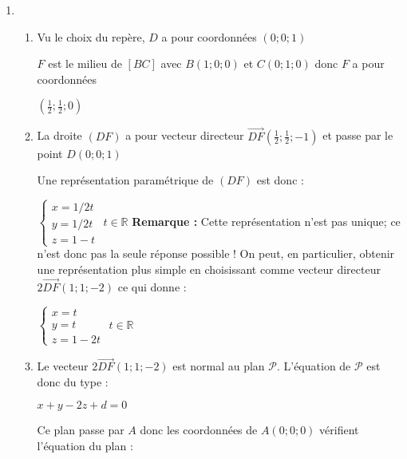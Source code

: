 \begin{corrige}
     \begin{enumerate}
          \item
          \begin{enumerate}[label=\alph*.]
               \item
               Vu le choix du repère, $D$ a pour coordonnées $\left(0;0;1\right)$
               \par
               $F$ est le milieu de $\left[BC\right]$ avec $B\left(1;0;0\right)$ et $C\left(0;1;0\right)$ donc $F$ a pour coordonnées
               \par
               $\left(\frac{1}{2};\frac{1}{2};0\right)$
               \item
               La droite $\left(DF\right)$ a pour vecteur directeur $\overrightarrow{DF}\left(\frac{1}{2};\frac{1}{2};-1\right)$ et passe par le point  $D\left(0;0;1\right)$
               \par
               Une représentation paramétrique de $\left(DF\right)$ est donc :
               \par
               $\left\{ \begin{matrix} x=1/2 t  \\ y=1/2 t  \\ z=1-t \end{matrix}\right.$    $       t\in \mathbb{R}$
                    \textbf{Remarque : }
                    Cette représentation n'est pas unique; ce n'est donc pas la seule réponse possible ! On peut, en particulier, obtenir une représentation plus simple en choisissant comme vecteur directeur $2\overrightarrow{DF}\left(1;1;-2\right)$ ce qui donne :
                    \par
                    $\left\{ \begin{matrix} x=t  \\ y=t  \\ z=1-2t \end{matrix}\right.$    $       t\in \mathbb{R}$
                         \item
                         Le vecteur $2\overrightarrow{DF}\left(1;1;-2\right)$ est normal au plan $\mathscr P$. L'équation de $\mathscr P$ est donc du type :
                         \par
                         $x+y-2z+d=0$
                         \par
                         Ce plan passe par $A$ donc les coordonnées de $A\left(0;0;0\right)$ vérifient l'équation du plan :

\end{enumerate}
\end{enumerate}
\end{corrige}
